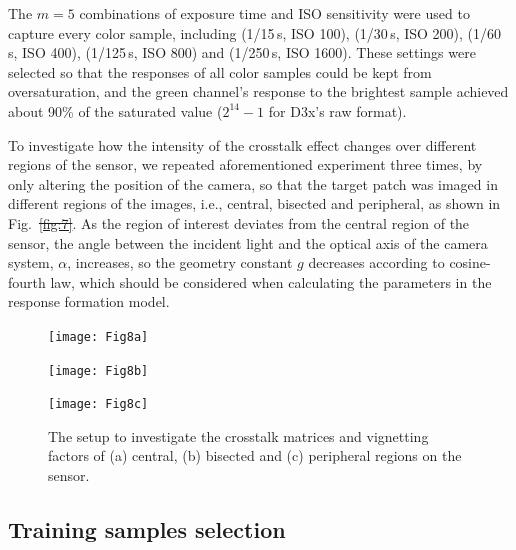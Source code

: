 \documentclass[9pt,twocolumn,twoside]{osajnl}
\providecommand{\DIFadd}[1]{{\protect\color{blue}\uwave{#1}}} %
\providecommand{\DIFdel}[1]{{\protect\color{red}\sout{#1}}}                      %
\providecommand{\DIFaddbegin}{} %
\providecommand{\DIFaddend}{} %
\providecommand{\DIFdelbegin}{} %
\providecommand{\DIFdelend}{} %
\providecommand{\DIFaddbeginFL}{} %
\providecommand{\DIFaddendFL}{} %
\providecommand{\DIFdelbeginFL}{} %
\providecommand{\DIFdelendFL}{} %
\begin{document}
The $m=5$ combinations of exposure time and ISO sensitivity were used to capture every color sample, including (1/15\,s, ISO 100), (1/30\,s, ISO 200), (1/60\,s, ISO 400), (1/125\,s, ISO 800) and (1/250\,s, ISO 1600). These settings were selected so that the responses of all color samples could be kept from oversaturation, and the green channel’s response to the brightest sample achieved about 90\% of the saturated value ($2^{14}-1$ for D3x’s raw format).

To investigate how the intensity of the crosstalk effect changes over different regions of the sensor, we repeated aforementioned experiment three times, by only altering the position of the camera, so that the target patch was imaged in different regions of the images, i.e., central, bisected and peripheral, as shown in Fig.~\DIFdelbegin \DIFdel{\ref{fig:7}}\DIFdelend \DIFaddbegin \DIFadd{\ref{fig:8}}\DIFaddend . As the region of interest deviates from the central region of the sensor, the angle between the incident light and the optical axis of the camera system, $\alpha$, increases, so the geometry constant $g$ decreases according to cosine-fourth law, which should be considered when calculating the parameters in the response formation model.

\begin{figure}[tbp]
	\centering
	\begin{minipage}{0.32\linewidth}
		\centering
		\DIFdelbeginFL %
\DIFdelendFL \DIFaddbeginFL \texttt{[image: Fig8a]}
	\DIFaddendFL \end{minipage}%
	\hfill
	\begin{minipage}{0.32\linewidth}
		\centering
		\DIFdelbeginFL %
\DIFdelendFL \DIFaddbeginFL \texttt{[image: Fig8b]}
	\DIFaddendFL \end{minipage}%
	\hfill
	\begin{minipage}{0.32\linewidth}
		\centering
		\DIFdelbeginFL %
\DIFdelendFL \DIFaddbeginFL \texttt{[image: Fig8c]}
	\DIFaddendFL \end{minipage}
	\caption{The setup to investigate the crosstalk matrices and vignetting factors of (a) central, (b) bisected and (c) peripheral regions on the sensor.}
	\DIFdelbeginFL %
\DIFdelendFL \DIFaddbeginFL \label{fig:8}
\DIFaddendFL \end{figure}

\subsection{Training samples selection}\label{sec:training samples selection}
\end{document}
